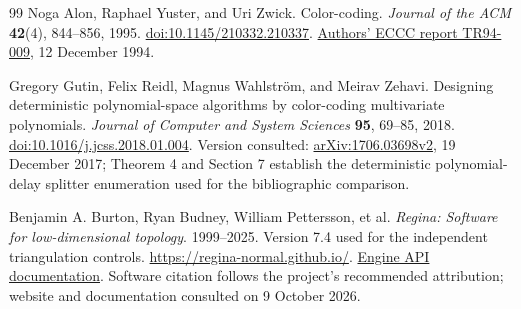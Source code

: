 \begin{thebibliography}{99}
Noga Alon, Raphael Yuster, and Uri Zwick.
Color-coding.
\emph{Journal of the ACM} \textbf{42}(4), 844--856, 1995.
\href{https://doi.org/10.1145/210332.210337}{doi:10.1145/210332.210337}.
\href{https://eccc.weizmann.ac.il/report/1994/009/}{Authors' ECCC report TR94-009},
12 December 1994.

Gregory Gutin, Felix Reidl, Magnus Wahlstr\"om, and Meirav Zehavi.
Designing deterministic polynomial-space algorithms by color-coding
multivariate polynomials.
\emph{Journal of Computer and System Sciences} \textbf{95}, 69--85, 2018.
\href{https://doi.org/10.1016/j.jcss.2018.01.004}{doi:10.1016/j.jcss.2018.01.004}.
Version consulted: \href{https://arxiv.org/abs/1706.03698v2}{arXiv:1706.03698v2},
19 December 2017; Theorem 4 and Section 7 establish the deterministic
polynomial-delay splitter enumeration used for the bibliographic comparison.

Benjamin A. Burton, Ryan Budney, William Pettersson, et al.
\emph{Regina: Software for low-dimensional topology}.
1999--2025. Version 7.4 used for the independent triangulation controls.
\url{https://regina-normal.github.io/}.
\href{https://regina-normal.github.io/engine-docs/}{Engine API documentation}.
Software citation follows the project's recommended attribution; website
and documentation consulted on 9 October 2026.

\end{thebibliography}
\endgroup
